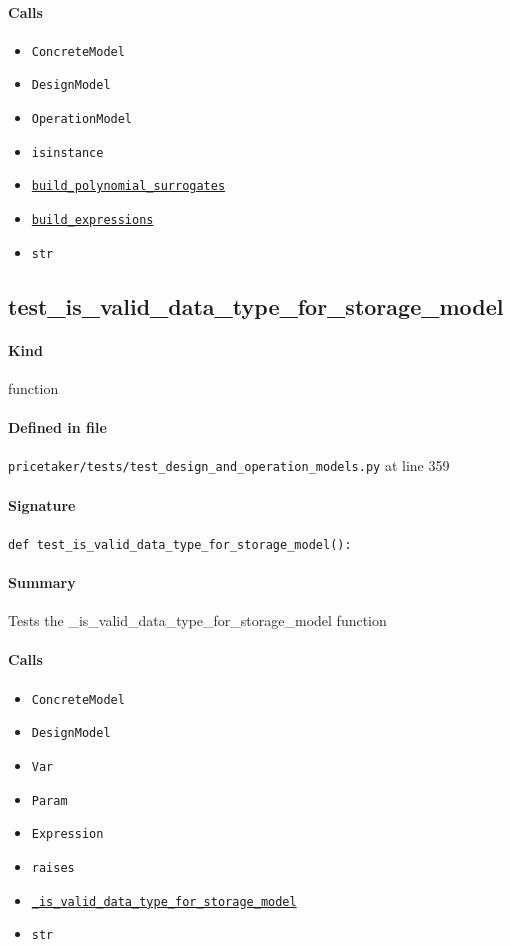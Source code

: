\documentclass[11pt]{report}
\begin{document}
\paragraph{Calls}
\begin{itemize}[leftmargin=*]
  \item \texttt{ConcreteModel}
  \item \texttt{DesignModel}
  \item \texttt{OperationModel}
  \item \texttt{isinstance}
  \item \hyperref[def:pricetaker-design_and_operation_models.py:OperationModelData.build_polynomial_surrogates:L449]{\texttt{build\_polynomial\_surrogates}}
  \item \hyperref[def:pricetaker-design_and_operation_models.py:OperationModelData.build_expressions:L460]{\texttt{build\_expressions}}
  \item \texttt{str}
\end{itemize}
\subsection{test\_is\_valid\_data\_type\_for\_storage\_model}
\label{def:pricetaker-tests-test_design_and_operation_models.py:test_is_valid_data_type_for_storage_model:L359}
\paragraph{Kind} function
\paragraph{Defined in file} \texttt{pricetaker/tests/test\_design\_and\_operation\_models.py} at line 359
\paragraph{Signature} \texttt{def test\_is\_valid\_data\_type\_for\_storage\_model():}
\paragraph{Summary} Tests the \_is\_valid\_data\_type\_for\_storage\_model function
\paragraph{Calls}
\begin{itemize}[leftmargin=*]
  \item \texttt{ConcreteModel}
  \item \texttt{DesignModel}
  \item \texttt{Var}
  \item \texttt{Param}
  \item \texttt{Expression}
  \item \texttt{raises}
  \item \hyperref[def:pricetaker-design_and_operation_models.py:_is_valid_data_type_for_storage_model:L477]{\texttt{\_is\_valid\_data\_type\_for\_storage\_model}}
  \item \texttt{str}
\end{itemize}
\end{document}
